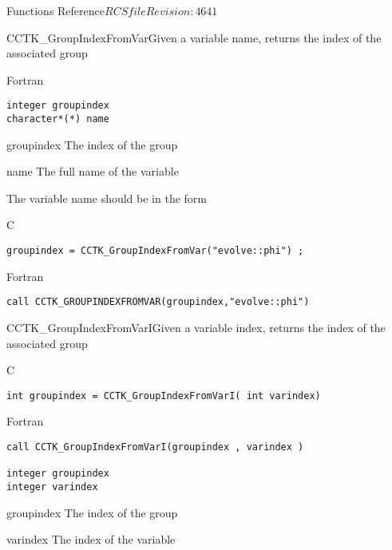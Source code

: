 \begin{cactuspart}{ Functions Reference}{$RCSfile$}{$Revision: 4641 $}
\begin{FunctionDescription}{CCTK\_GroupIndexFromVar}{Given a variable name, returns the index of the associated group}
\begin{SynopsisSection}
\begin{Synopsis}{Fortran}
\begin{verbatim}
integer groupindex
character*(*) name \end{verbatim}
\end{Synopsis}
\end{SynopsisSection}
\begin{ParameterSection}
\begin{Parameter}{groupindex}
The index of the group
\end{Parameter}
\begin{Parameter}{name}
The full name of the variable
\end{Parameter}
\end{ParameterSection}
\begin{Discussion}
The variable name should be in the form 
\end{Discussion}
\begin{ExampleSection}
\begin{Example}{C}
\begin{verbatim}
groupindex = CCTK_GroupIndexFromVar("evolve::phi") ;
\end{verbatim}
\end{Example}
\begin{Example}{Fortran}
\begin{verbatim}
call CCTK_GROUPINDEXFROMVAR(groupindex,"evolve::phi")
\end{verbatim}
\end{Example}
\end{ExampleSection}
\end{FunctionDescription}


\begin{FunctionDescription}{CCTK\_GroupIndexFromVarI}{Given a variable index, returns the index of the associated group}
\label{CCTK-GroupIndexFromVarI}
\begin{SynopsisSection}
\begin{Synopsis}{C}
\begin{verbatim}int groupindex = CCTK_GroupIndexFromVarI( int varindex)\end{verbatim}
\end{Synopsis}
\begin{Synopsis}{Fortran}
\begin{verbatim}call CCTK_GroupIndexFromVarI(groupindex , varindex )

integer groupindex
integer varindex \end{verbatim}
\end{Synopsis}
\end{SynopsisSection}
\begin{ParameterSection}
\begin{Parameter}{groupindex}
The index of the group
\end{Parameter}
\begin{Parameter}{varindex}
The index of the variable
\end{Parameter}
\end{ParameterSection}


\end{FunctionDescription}
\end{cactuspart}

